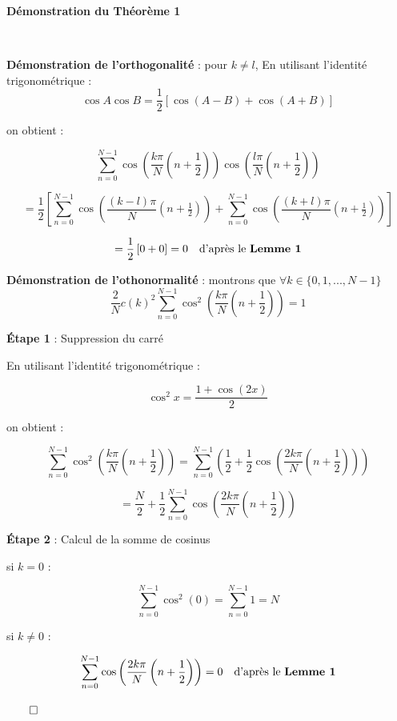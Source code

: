 \documentclass{article}
\newenvironment{myproof}[1][\proofname]{%
  \begin{proofbox}%
}{\hfill$\qed$\end{proofbox}}
\begin{document}
\begin{myproof}
    \textbf{Démonstration du Théorème 1}

    \ \ 
    
    \textbf{Démonstration de l'orthogonalité} : pour \( k \neq l \), En utilisant l'identité trigonométrique :
    \[
    \cos A \cos B = \frac{1}{2} \left[ \cos(A - B) + \cos(A + B) \right]
    \]
    
    on obtient :
    
    \[
    \sum_{n=0}^{N-1} \cos \left( \frac{k\pi}{N} \left( n + \frac{1}{2} \right) \right)\cos \left( \frac{l\pi}{N} \left( n + \frac{1}{2} \right) \right)
    \]
    
    \[
    = \frac{1}{2} \left[ \sum_{n=0}^{N-1} \cos\left( \frac{(k - l)\pi}{N}(n + \tfrac{1}{2}) \right) + \sum_{n=0}^{N-1} \cos\left( \frac{(k + l)\pi}{N}(n + \tfrac{1}{2}) \right) \right]
    \]
    
    \[
    = \frac{1}{2} \left[ 0 + 0 \right] = 0 \quad \text{d'après le \textbf{Lemme 1}}
    \]
    
    \vspace{.7cm}
    
    \textbf{Démonstration de l'othonormalité} : montrons que $\forall k \in \{0, 1, ..., N-1\}$
    $$
    \dfrac{2}{N} c(k)^2 \sum_{n=0}^{N-1} \cos^2\left(\frac{k\pi}{N} \left(n + \frac{1}{2} \right)\right) = 1
    $$

    \textbf{Étape 1} : Suppression du carré
    
    En utilisant l'identité trigonométrique :
    
    $$
    \cos^2 x = \frac{1 + \cos(2x)}{2}
    $$
    
    on obtient :
    
    $$
    \sum_{n=0}^{N-1} \cos^2\left(\frac{k\pi}{N} \left(n + \frac{1}{2} \right)\right) = \sum_{n=0}^{N-1} \left( \frac{1}{2} + \frac{1}{2} \cos\left(\frac{2k\pi}{N} \left(n + \frac{1}{2} \right)\right) \right)
    $$
    
    $$
    = \frac{N}{2} + \frac{1}{2} \sum_{n=0}^{N-1} \cos\left(\frac{2k\pi}{N} \left(n + \frac{1}{2} \right)\right)
    $$

    \textbf{Étape 2} : Calcul de la somme de cosinus


    si $k = 0$ :
    
    $$
    \sum_{n=0}^{N-1} \cos^2\left(0\right) = \sum_{n=0}^{N-1} 1 = N
    $$
    
    si $k \neq 0$ :
    
    $$
    \sum_{n=0}^{N-1} \cos\left(\frac{2k\pi}{N} \left(n + \frac{1}{2} \right)\right) = 0 \quad \text{d'après le \textbf{Lemme 1}}
    $$
    

\end{myproof}
\end{document}
